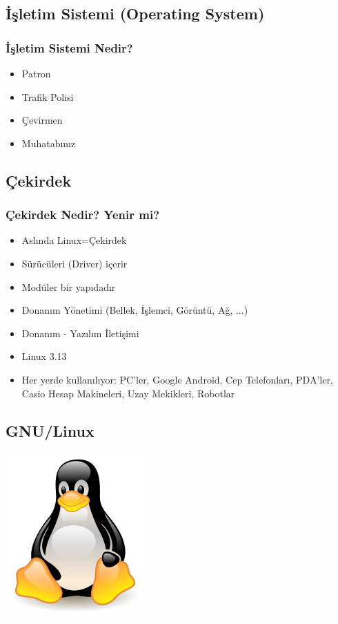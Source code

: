 \documentclass{beamer}
\begin{document}
	\subsection{İşletim Sistemi (Operating System)}
		\begin{frame}
			\frametitle{İşletim Sistemi Nedir?}
			\begin{itemize}
			 \item Patron
			 \item Trafik Polisi 
			 \item Çevirmen
			 \item Muhatabınız 
			\end{itemize}

		\end{frame}

	\subsection{Çekirdek}
		\begin{frame}
		 	\frametitle{Çekirdek Nedir? Yenir mi?}
			\begin{itemize}
			 \item Aslında Linux=Çekirdek
			 \item Sürücüleri (Driver)  içerir
			 \item Modüler bir yapıdadır
			 \item Donanım Yönetimi (Bellek, İşlemci, Görüntü, Ağ, ...)
			 \item Donanım - Yazılım İletişimi			 
			 \item Linux 3.13
			 \item Her yerde kullanılıyor: PC'ler, Google Android, Cep Telefonları, PDA'ler, Casio Hesap Makineleri, Uzay Mekikleri, Robotlar
			 

			\end{itemize}
			
		\end{frame}

	\subsection{GNU/Linux}
		\begin{frame}
		\begin{center}
 		 \includegraphics{img/linux.png}
		\end{center}
		\end{frame}
\end{document}
